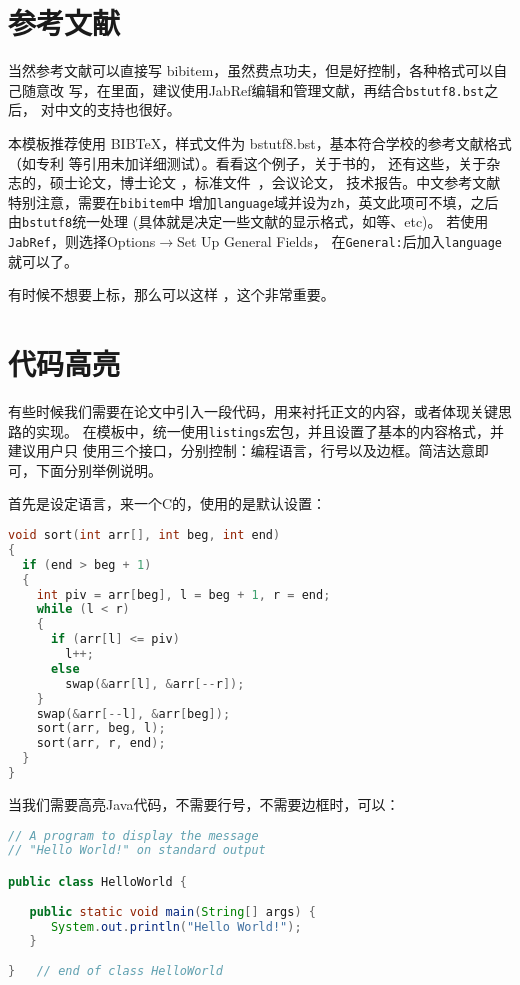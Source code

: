 \section{参考文献}
\label{sec:bib}
当然参考文献可以直接写 bibitem，虽然费点功夫，但是好控制，各种格式可以自己随意改
写，在\scnuthesis{}里面，建议使用JabRef编辑和管理文献，再结合\verb|bstutf8.bst|之后，
对中文的支持也很好。

本模板推荐使用 BIB\TeX，样式文件为 bstutf8.bst，基本符合学校的参考文献格式（如专利
等引用未加详细测试）。看看这个例子，关于书的，
还有这些，关于杂志的，硕士论文，博士论文
，标准文件~，会议论文，%
技术报告。中文参考文献\textsf{特别注意}，需要在\verb|bibitem|中
增加\verb|language|域并设为\verb|zh|，英文此项可不填，之后由\verb|bstutf8|统一处理
(具体就是决定一些文献的显示格式，如等、etc)。
若使用\verb|JabRef|，则选择\textsf{Options}$\rightarrow$\textsf{Set Up General Fields}，
在\verb|General:|后加入\verb|language|就可以了。

有时候不想要上标，那么可以这样 \cite{shaheshang}，这个非常重要。

\section{代码高亮}
有些时候我们需要在论文中引入一段代码，用来衬托正文的内容，或者体现关键思路的实现。
在模板中，统一使用\texttt{listings}宏包，并且设置了基本的内容格式，并建议用户只
使用三个接口，分别控制：编程语言，行号以及边框。简洁达意即可，下面分别举例说明。

首先是设定语言，来一个C的，使用的是默认设置：
\begin{lstlisting}[language=C]
void sort(int arr[], int beg, int end)
{
  if (end > beg + 1)
  {
    int piv = arr[beg], l = beg + 1, r = end;
    while (l < r)
    {
      if (arr[l] <= piv)
        l++;
      else
        swap(&arr[l], &arr[--r]);
    }
    swap(&arr[--l], &arr[beg]);
    sort(arr, beg, l);
    sort(arr, r, end);
  }
}
\end{lstlisting}

当我们需要高亮Java代码，不需要行号，不需要边框时，可以：
\begin{lstlisting}[language=Java,numbers=none,frame=none]
// A program to display the message
// "Hello World!" on standard output

public class HelloWorld {
 
   public static void main(String[] args) {
      System.out.println("Hello World!");
   }
      
}   // end of class HelloWorld
\end{lstlisting}

